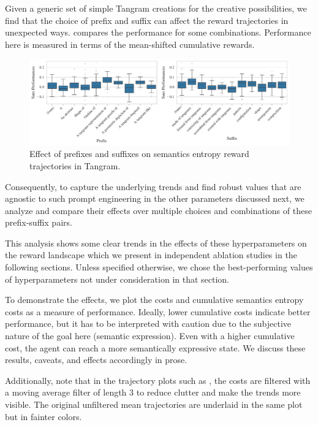 Given a generic set of simple Tangram creations for the creative possibilities, we find that the choice of prefix and suffix can affect the reward trajectories in unexpected ways.  compares the performance for some combinations.
Performance here is measured in terms of the mean-shifted cumulative rewards.

\begin{figure}[h]
    \centering
    \includegraphics[width=\textwidth]{images/prefix-suffix.pdf}
    \caption{Effect of prefixes and suffixes on semantics entropy reward trajectories in Tangram.}
    \label{fig:prefix-suffix}
\end{figure}
\vspace{-7pt}

Consequently, to capture the underlying trends and find robust values that are agnostic to such prompt engineering in the other parameters discussed next, we analyze and compare their effects over multiple choices and combinations of these prefix-suffix pairs.

This analysis shows some clear trends in the effects of these hyperparameters on the reward landscape which we present in independent ablation studies in the following sections.
Unless specified otherwise, we chose the best-performing values of hyperparameters not under consideration in that section.

To demonstrate the effects, we plot the costs and cumulative semantics entropy costs as a measure of performance.
Ideally, lower cumulative costs indicate better performance, but it has to be interpreted with caution due to the subjective nature of the goal here (semantic expression). Even with a higher cumulative cost, the agent can reach a more semantically expressive state.
We discuss these results, caveats, and effects accordingly in prose.

Additionally, note that in the trajectory plots such as , the costs are filtered with a moving average filter of length \(3\) to reduce clutter and make the trends more visible.
The original unfiltered mean trajectories are underlaid in the same plot but in fainter colors.


